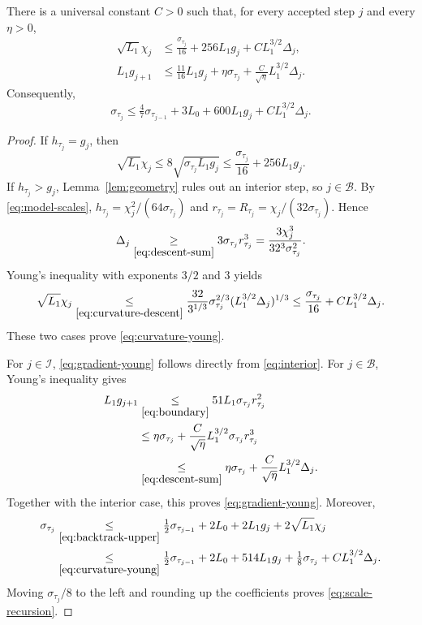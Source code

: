 \begin{lemma}\label{lem:young}
There is a universal constant $C>0$ such that, for every
accepted step $j$ and every $\eta>0$,
\begin{align}
 \sqrt{L_1}\chi_j
 &\le\frac{\sigma_{\tau_j}}{16}+256L_1g_j
                         +CL_1^{3/2}\Delta_j,\label{eq:curvature-young}\\
 L_1g_{j+1}
 &\le\tfrac{11}{16}L_1g_j+\eta\sigma_{\tau_j}
                         +\frac{C}{\sqrt\eta}L_1^{3/2}\Delta_j.
                         \label{eq:gradient-young}
\end{align}
Consequently,
\begin{equation}\label{eq:scale-recursion}
 \sigma_{\tau_j}\le\tfrac47\sigma_{\tau_{j-1}}
                         +3L_0+600L_1g_j+CL_1^{3/2}\Delta_j.
\end{equation}
\end{lemma}
\begin{proof}
If $h_{\tau_j}=g_j$, then
\[
 \sqrt{L_1}\chi_j
       \le
       8\sqrt{\sigma_{\tau_j}L_1g_j}
       \le\frac{\sigma_{\tau_j}}{16}+256L_1g_j.
\]
If $h_{\tau_j}>g_j$, Lemma~\ref{lem:geometry} rules out an interior
step, so $j\in\mathcal B$. By \eqref{eq:model-scales},
$h_{\tau_j}=\chi_j^2/(64\sigma_{\tau_j})$ and
$r_{\tau_j}=R_{\tau_j}=\chi_j/(32\sigma_{\tau_j})$. Hence
\begin{equation}\label{eq:curvature-descent}
 \Delta_j\underset{\eqref{eq:descent-sum}}{\ge}
 3\sigma_{\tau_j}r_{\tau_j}^3
 =\frac{3\chi_j^3}{32^3\sigma_{\tau_j}^2}.
\end{equation}
Young's inequality with exponents $3/2$ and $3$ yields
\[
 \sqrt{L_1}\chi_j
 \underset{\eqref{eq:curvature-descent}}{\le}
 \frac{32}{3^{1/3}}\sigma_{\tau_j}^{2/3}
                      (L_1^{3/2}\Delta_j)^{1/3}
 \le\frac{\sigma_{\tau_j}}{16}+CL_1^{3/2}\Delta_j.
\]
These two cases prove \eqref{eq:curvature-young}.

For $j\in\mathcal I$, \eqref{eq:gradient-young} follows directly
from \eqref{eq:interior}. For $j\in\mathcal B$, Young's inequality gives
\[
 \begin{aligned}
 L_1g_{j+1}
 &\underset{\eqref{eq:boundary}}{\le}51L_1\sigma_{\tau_j}r_{\tau_j}^2\\
 &\le\eta\sigma_{\tau_j}
          +\frac{C}{\sqrt\eta}L_1^{3/2}\sigma_{\tau_j}r_{\tau_j}^3\\
 &\underset{\eqref{eq:descent-sum}}{\le}\eta\sigma_{\tau_j}
          +\frac{C}{\sqrt\eta}L_1^{3/2}\Delta_j.
 \end{aligned}
\]
Together with the interior case, this proves \eqref{eq:gradient-young}.
Moreover,
\[
 \begin{aligned}
 \sigma_{\tau_j}
 &\underset{\eqref{eq:backtrack-upper}}{\le}
 \tfrac12\sigma_{\tau_{j-1}}+2L_0+2L_1g_j+2\sqrt{L_1}\chi_j\\
 &\underset{\eqref{eq:curvature-young}}{\le}
 \tfrac12\sigma_{\tau_{j-1}}+2L_0+514L_1g_j
                  +\tfrac18\sigma_{\tau_j}+CL_1^{3/2}\Delta_j.
 \end{aligned}
\]
Moving $\sigma_{\tau_j}/8$ to the left and rounding up the
coefficients proves \eqref{eq:scale-recursion}.
\end{proof}

